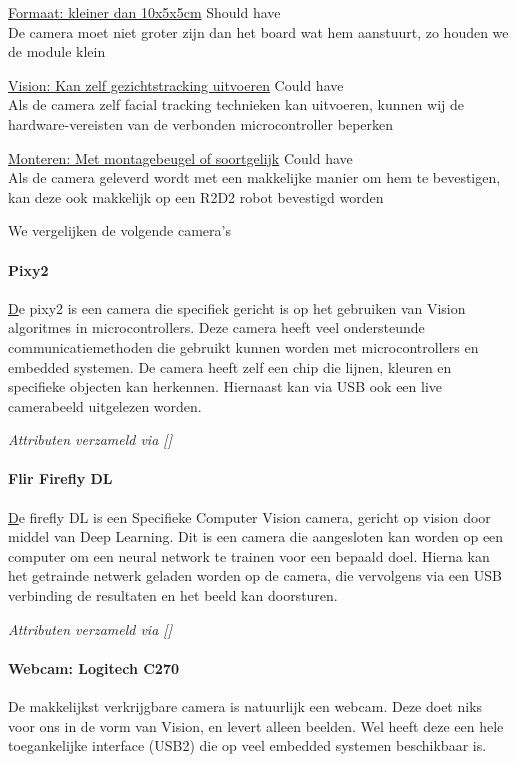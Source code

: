 \documentclass[11pt]{article}
\begin{document}
    \noindent \underline{Formaat: kleiner dan 10x5x5cm} \hfill Should have\\
    De camera moet niet groter zijn dan het board wat hem aanstuurt, zo houden we de module klein

    \noindent \underline{Vision: Kan zelf gezichtstracking uitvoeren} \hfill Could have\\
    Als de camera zelf facial tracking technieken kan uitvoeren, kunnen wij de hardware-vereisten van de verbonden microcontroller beperken

    \noindent \underline{Monteren: Met montagebeugel of soortgelijk} \hfill Could have\\
    Als de camera geleverd wordt met een makkelijke manier om hem te bevestigen, kan deze ook makkelijk op een R2D2 robot bevestigd worden


    \vspace{1em}

    We vergelijken de volgende camera's

    \paragraph{Pixy2}
    \href{https://pixycam.com/pixy2/}
    De pixy2 is een camera die specifiek gericht is op het gebruiken van Vision algoritmes in microcontrollers.
    Deze camera heeft veel ondersteunde communicatiemethoden die gebruikt kunnen worden met microcontrollers en embedded systemen.
    De camera heeft zelf een chip die lijnen, kleuren en specifieke objecten kan herkennen.
    Hiernaast kan via USB ook een live camerabeeld uitgelezen worden.


    \emph{Attributen verzameld via []}

    \paragraph{Flir Firefly DL}
    \href{https://www.flir.com/products/firefly-dl/}
    De firefly DL is een Specifieke Computer Vision camera, gericht op vision door middel van Deep Learning.
    Dit is een camera die aangesloten kan worden op een computer om een neural network te trainen voor een bepaald doel.
    Hierna kan het getrainde netwerk geladen worden op de camera, die vervolgens via een USB verbinding de resultaten en het beeld kan doorsturen.


    \emph{Attributen verzameld via []}

    \paragraph{Webcam: Logitech C270}
    De makkelijkst verkrijgbare camera is natuurlijk een webcam. Deze doet niks voor ons in de vorm van Vision, en levert alleen beelden.
    Wel heeft deze een hele toegankelijke interface (USB2) die op veel embedded systemen beschikbaar is.
\end{document}
